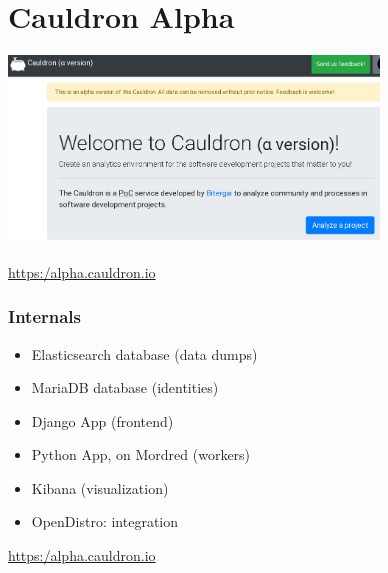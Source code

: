 \documentclass[17pt,aspectratio=169,hyperref=pdfusetitle]{beamer}
\begin{document}
\section{Cauldron Alpha}


\begin{frame}

\begin{center}
\includegraphics[height=5cm]{figs/cauldron-start}
\end{center}

\begin{flushright}
      \url{https:/alpha.cauldron.io}
\end{flushright}
\end{frame}


\begin{frame}
\frametitle{Internals}

\begin{itemize}
\item Elasticsearch database (data dumps)
\item MariaDB database (identities)
\item Django App (frontend)
\item Python App, on Mordred (workers)
\item Kibana (visualization)
\item OpenDistro: integration
\end{itemize}

\begin{flushright}
      \url{https:/alpha.cauldron.io}
\end{flushright}
\end{frame}

\end{document}
